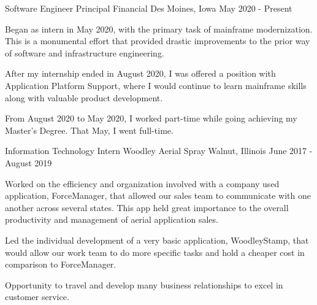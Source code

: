 \begin{cventries}
    \cventry
    {Software Engineer} %
    {Principal Financial} %
    {Des Moines, Iowa} %
    {May 2020 - Present} %
    {
      \begin{cvitems} %
        \item {Began as intern in May 2020, with the primary task of mainframe modernization. This is a monumental
            effort that provided drastic improvements to the prior way of software and infrastructure engineering.}
        \item {After my internship ended in August 2020, I was offered a position with Application Platform Support, 
            where I would continue to learn mainframe skills along with valuable product development.}
        \item {From August 2020 to May 2020, I worked part-time while going achieving my Master's Degree. That May,
            I went full-time.}
      \end{cvitems}
    }
    
    \cventry
    {Information Technology Intern} %
    {Woodley Aerial Spray} %
    {Walnut, Illinois} %
    {June 2017 - August 2019} %
    {
      \begin{cvitems} %
        \item {Worked on the efficiency and organization involved with a company used application, ForceManager, that allowed our sales team to communicate with one another across several states. This app held great importance to the overall productivity and management of aerial application sales.}
        \item {Led the individual development of a very basic application, WoodleyStamp, that would allow our work team to do more specific tasks and hold a cheaper cost in comparison to ForceManager.}
        \item {Opportunity to travel and develop many business relationships to excel in customer service.}
      \end{cvitems}
    }
    

\end{cventries}
